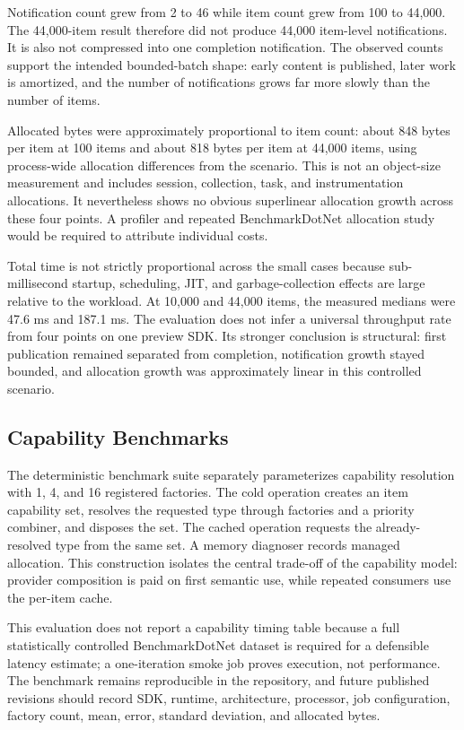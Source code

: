 \documentclass[10pt,a4paper,twoside]{article}
\begin{document}
Notification count grew from 2 to 46 while item count grew from 100 to 44,000. The 44,000-item result therefore
did not produce 44,000 item-level notifications. It is also not compressed into one completion notification. The
observed counts support the intended bounded-batch shape: early content is published, later work is amortized,
and the number of notifications grows far more slowly than the number of items.

Allocated bytes were approximately proportional to item count: about 848 bytes per item at 100 items and about
818 bytes per item at 44,000 items, using process-wide allocation differences from the scenario. This is not an
object-size measurement and includes session, collection, task, and instrumentation allocations. It nevertheless
shows no obvious superlinear allocation growth across these four points. A profiler and repeated BenchmarkDotNet
allocation study would be required to attribute individual costs.

Total time is not strictly proportional across the small cases because sub-millisecond startup, scheduling, JIT,
and garbage-collection effects are large relative to the workload. At 10,000 and 44,000 items, the measured
medians were 47.6 ms and 187.1 ms. The evaluation does not infer a universal throughput rate from four points on
one preview SDK. Its stronger conclusion is structural: first publication remained separated from completion,
notification growth stayed bounded, and allocation growth was approximately linear in this controlled scenario.

\subsection{Capability Benchmarks}

The deterministic benchmark suite separately parameterizes capability resolution with 1, 4, and 16 registered
factories. The cold operation creates an item capability set, resolves the requested type through factories and a
priority combiner, and disposes the set. The cached operation requests the already-resolved type from the same
set. A memory diagnoser records managed allocation. This construction isolates the central trade-off of the
capability model: provider composition is paid on first semantic use, while repeated consumers use the per-item
cache.

This evaluation does not report a capability timing table because a full statistically controlled BenchmarkDotNet
dataset is required for a defensible latency estimate; a one-iteration smoke job proves execution, not performance.
The benchmark remains reproducible in the repository, and future published revisions should record SDK, runtime,
architecture, processor, job configuration, factory count, mean, error, standard deviation, and allocated bytes.
\end{document}
